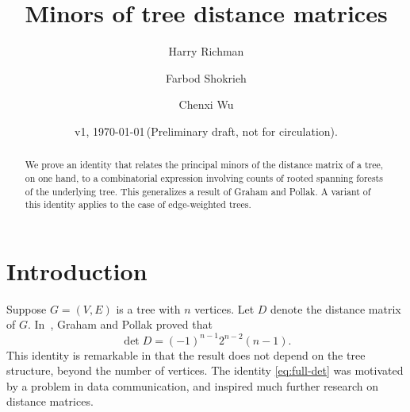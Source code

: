 \documentclass{amsart}
\theoremstyle{definition}
\begin{document}
\title[Tree distance minors]{Minors of tree distance matrices}
\author{Harry Richman}
\author{Farbod Shokrieh}
\author{Chenxi Wu}
\date{v1, \today  \,(Preliminary draft, not for circulation).}


\begin{abstract}
We prove an identity that relates 
the principal minors of
the distance matrix of a tree, on one hand,
to a combinatorial expression involving counts of rooted spanning forests of the underlying tree.
This generalizes a result of Graham and Pollak.
A variant of this identity applies to the case of edge-weighted trees.
\end{abstract}
\maketitle

\setcounter{tocdepth}{1}
\tableofcontents

\section{Introduction}

Suppose $G = (V,E)$ is a tree with $n$ vertices.
Let $D$ denote the distance matrix of $G$.
In~\cite{graham-pollak}, Graham and Pollak proved that
\begin{equation}\label{eq:full-det}
\det D = (-1)^{n-1} 2^{n-2} (n-1). 
\end{equation}
This identity is remarkable in that the result does not depend on the tree structure,
beyond the number of vertices.
The identity \eqref{eq:full-det} was motivated by a problem in data communication,
and inspired much further research on distance matrices.
\end{document}
